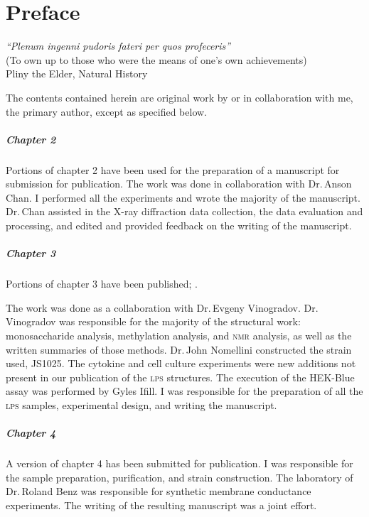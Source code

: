 
\chapter{Preface}
\begin{epigraph} 
\textit{``Plenum ingenni pudoris fateri per quos profeceris''}\\
(To own up to those who were the means of one's own achievements)\\
Pliny the Elder, Natural History
\end{epigraph} 

The contents contained herein are original work by or in collaboration with me,
the primary author, except as specified below.

\paragraph{Chapter 2} 
Portions of chapter 2 have been used for the preparation of a manuscript for
submission for publication. The work was done in collaboration with Dr.\,Anson
Chan. I performed all the experiments and wrote the majority of the
manuscript. Dr.\,Chan assisted in the X-ray diffraction data collection, the
data evaluation and processing, and edited and provided feedback on the writing
of the manuscript. 

\paragraph{Chapter 3}
Portions of chapter 3 have been published;
\makeatletter%
%
\bgroup%
  \def\blx@maxcitenames{99}%
  \makeatother%
  .
\egroup%

\makeatletter
{}
\makeatother
 The work was
done as a collaboration with Dr.\,Evgeny Vinogradov. Dr.\,Vinogradov was
responsible for the majority of the structural work: monosaccharide analysis,
methylation analysis, and \textsc{nmr} analysis, as well as the written
summaries of those methods. Dr.\,John Nomellini constructed the strain used,
JS1025. The cytokine and cell culture experiments were new additions not present
in our publication of the \textsc{lps} structures. The execution of the HEK-Blue assay was performed by Gyles Ifill. I was
responsible for the preparation of all the \textsc{lps} samples, experimental design, and
writing the manuscript. 

\paragraph{Chapter 4}
A version of chapter 4 has been submitted for publication. I was responsible for
the sample preparation, purification, and strain construction. The laboratory of
Dr.\,Roland Benz was responsible for synthetic membrane conductance experiments.
The writing of the resulting manuscript was a joint effort.